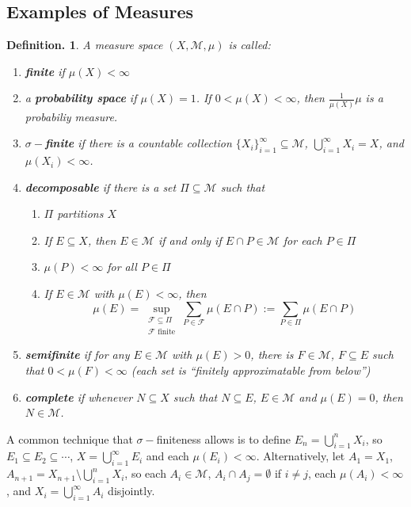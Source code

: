 \documentclass[11pt, a4paper]{memoir}
\theoremstyle{change}
\theoremstyle{plain}
\theoremstyle{nonumberplain}
\newtheorem{definition}{Definition.}
\numberwithin{equation}{section}
\begin{document}
\subsection{Examples of Measures}
\begin{definition}
    A measure space $(X,\mathcal{M},\mu)$ is called:
    \begin{enumerate}[nolistsep]
        \item \textbf{finite} if $\mu(X)<\infty$
        \item a \textbf{probability space} if $\mu(X)=1$.
            If $0<\mu(X)<\infty$, then $\frac{1}{\mu(X)}\mu$ is a probabiliy measure.
        \item \textbf{$\sigma-$finite} if there is a countable collection $\{X_i\}_{i=1}^\infty\subseteq\mathcal{M}$, $\bigcup_{i=1}^\infty X_i=X$, and $\mu(X_i)<\infty$.
        \item \textbf{decomposable} if there is a set $\Pi\subseteq\mathcal{M}$ such that
            \begin{enumerate}[nl]
                \item $\Pi$ partitions $X$
                \item If $E\subseteq X$, then $E\in\mathcal{M}$ if and only if $E\cap P\in\mathcal{M}$ for each $P\in\Pi$
                \item $\mu(P)<\infty$ for all $P\in\Pi$
                \item If $E\in\mathcal{M}$ with $\mu(E)<\infty$, then
                    \begin{equation*}
                        \mu(E)=\sup_{\substack{\mathcal{F}\subseteq\Pi\\\mathcal{F} \text{ finite}}}\sum\limits_{P\in\mathcal{F}}\mu(E\cap P):=\sum\limits_{P\in\Pi}\mu(E\cap P)
                    \end{equation*}
            \end{enumerate}
        \item \textbf{semifinite} if for any $E\in\mathcal{M}$ with $\mu(E)>0$, there is $F\in\mathcal{M}$, $F\subseteq E$ such that $0<\mu(F)<\infty$ (each set is ``finitely approximatable from below'')
        \item \textbf{complete} if whenever $N\subseteq X$ such that $N\subseteq E$, $E\in\mathcal{M}$ and $\mu(E)=0$, then $N\in\mathcal{M}$.
    \end{enumerate}
\end{definition}
A common technique that $\sigma-$finiteness allows is to define $E_n=\bigcup_{i=1}^n X_i$, so $E_1\subseteq E_2\subseteq\cdots$, $X=\bigcup_{i=1}^\infty E_i$ and each $\mu(E_i)<\infty$.
Alternatively, let $A_1=X_1$, $A_{n+1}=X_{n+1}\setminus\bigcup_{i=1}^n X_i$, so each $A_i\in\mathcal{M}$, $A_i\cap A_j=\emptyset$ if $i\neq j$, each $\mu(A_i)<\infty$, and $X_i=\bigcup_{i=1}^\infty A_i$ disjointly.
\end{document}
